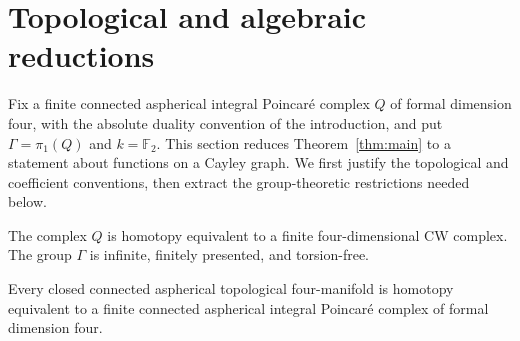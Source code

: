 \section{Topological and algebraic reductions}\label{sec:foundations}

Fix a finite connected aspherical integral Poincar\'e complex $Q$ of
formal dimension four, with the absolute duality convention of the
introduction, and put $\Gamma=\pi_1(Q)$ and $k=\mathbb F_2$.
This section reduces Theorem~\ref{thm:main} to a statement about functions
on a Cayley graph. We first justify the topological and coefficient
conventions, then extract the group-theoretic restrictions needed below.

\begin{lemma}\label{found:model}
The complex $Q$ is homotopy equivalent to a finite four-dimensional
CW complex. The group $\Gamma$ is infinite, finitely presented, and
torsion-free.

Every closed connected aspherical topological four-manifold is homotopy
equivalent to a finite connected aspherical integral Poincar\'e complex
of formal dimension four.
\end{lemma}

